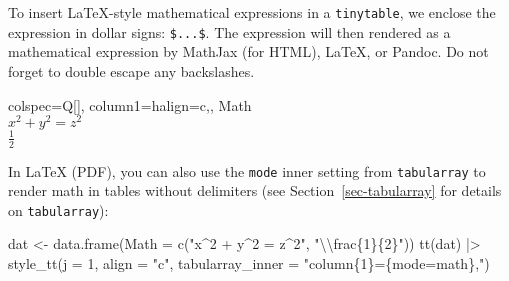\documentclass[
  letterpaper,
  DIV=11,
  numbers=noendperiod]{scrartcl}
\newenvironment{Shaded}{\begin{snugshade}}{\end{snugshade}}
\newcommand{\AttributeTok}[1]{\textcolor[rgb]{0.40,0.45,0.13}{#1}}
\newcommand{\DecValTok}[1]{\textcolor[rgb]{0.68,0.00,0.00}{#1}}
\newcommand{\FunctionTok}[1]{\textcolor[rgb]{0.28,0.35,0.67}{#1}}
\newcommand{\NormalTok}[1]{\textcolor[rgb]{0.00,0.23,0.31}{#1}}
\newcommand{\OtherTok}[1]{\textcolor[rgb]{0.00,0.23,0.31}{#1}}
\newcommand{\SpecialCharTok}[1]{\textcolor[rgb]{0.37,0.37,0.37}{#1}}
\newcommand{\StringTok}[1]{\textcolor[rgb]{0.13,0.47,0.30}{#1}}
\begin{document}
To insert LaTeX-style mathematical expressions in a \texttt{tinytable},
we enclose the expression in dollar signs: \texttt{\$...\$}. The
expression will then rendered as a mathematical expression by MathJax
(for HTML), LaTeX, or Pandoc. Do not forget to double escape any
backslashes.

\begin{Shaded}
\end{Shaded}

\begin{table}[H]
\centering
\begin{tblr}[         %
]                     %
{                     %
colspec={Q[]},
column{1}={halign=c,},
}                     %
\toprule
Math \\ \midrule %
$x^2 + y^2 = z^2$ \\
$\frac{1}{2}$    \\
\bottomrule
\end{tblr}
\end{table}

In LaTeX (PDF), you can also use the \texttt{mode} inner setting from
\texttt{tabularray} to render math in tables without delimiters (see
Section~\ref{sec-tabularray} for details on \texttt{tabularray}):

\begin{Shaded}
\begin{Highlighting}[]
\NormalTok{dat }\OtherTok{\textless{}{-}} \FunctionTok{data.frame}\NormalTok{(}\AttributeTok{Math =} \FunctionTok{c}\NormalTok{(}\StringTok{"x\^{}2 + y\^{}2 = z\^{}2"}\NormalTok{, }\StringTok{"}\SpecialCharTok{\textbackslash{}\textbackslash{}}\StringTok{frac\{1\}\{2\}"}\NormalTok{))}
\FunctionTok{tt}\NormalTok{(dat) }\SpecialCharTok{|\textgreater{}}
  \FunctionTok{style\_tt}\NormalTok{(}\AttributeTok{j =} \DecValTok{1}\NormalTok{, }\AttributeTok{align =} \StringTok{"c"}\NormalTok{, }\AttributeTok{tabularray\_inner =} \StringTok{"column\{1\}=\{mode=math\},"}\NormalTok{)}
\end{Highlighting}
\end{Shaded}
\end{document}
